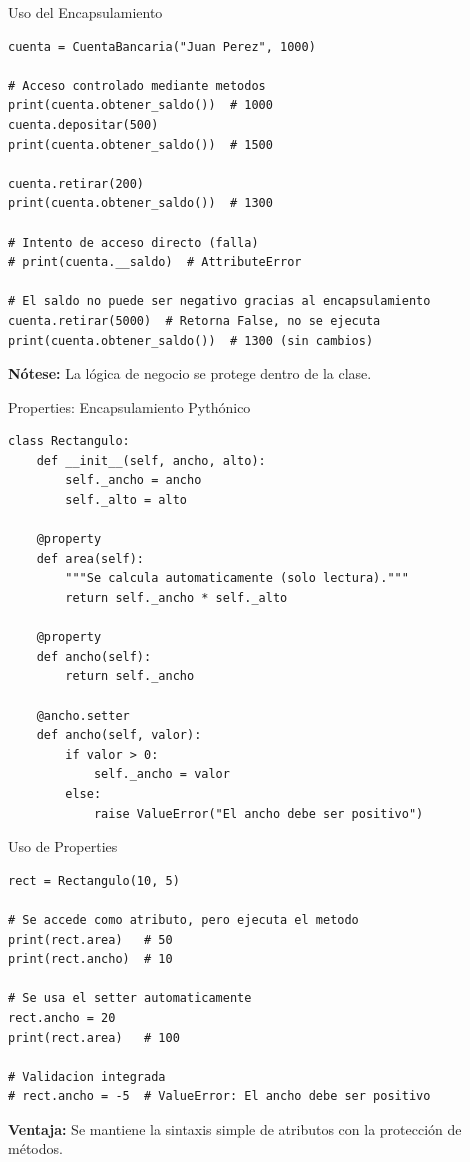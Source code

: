 \documentclass[aspectratio=169]{beamer}
\begin{document}
\begin{frame}[fragile]{Uso del Encapsulamiento}
    \begin{lstlisting}[title=Protección de Datos]
cuenta = CuentaBancaria("Juan Perez", 1000)

# Acceso controlado mediante metodos
print(cuenta.obtener_saldo())  # 1000
cuenta.depositar(500)
print(cuenta.obtener_saldo())  # 1500

cuenta.retirar(200)
print(cuenta.obtener_saldo())  # 1300

# Intento de acceso directo (falla)
# print(cuenta.__saldo)  # AttributeError

# El saldo no puede ser negativo gracias al encapsulamiento
cuenta.retirar(5000)  # Retorna False, no se ejecuta
print(cuenta.obtener_saldo())  # 1300 (sin cambios)
    \end{lstlisting}
    
    \textbf{Nótese:} La lógica de negocio se protege dentro de la clase.
\end{frame}

\begin{frame}[fragile]{Properties: Encapsulamiento Pythónico}
    \begin{lstlisting}[title=Uso de @property]
class Rectangulo:
    def __init__(self, ancho, alto):
        self._ancho = ancho
        self._alto = alto
    
    @property
    def area(self):
        """Se calcula automaticamente (solo lectura)."""
        return self._ancho * self._alto
    
    @property
    def ancho(self):
        return self._ancho
    
    @ancho.setter
    def ancho(self, valor):
        if valor > 0:
            self._ancho = valor
        else:
            raise ValueError("El ancho debe ser positivo")
    \end{lstlisting}
\end{frame}

\begin{frame}[fragile]{Uso de Properties}
    \begin{lstlisting}[title=Acceso Transparente]
rect = Rectangulo(10, 5)

# Se accede como atributo, pero ejecuta el metodo
print(rect.area)   # 50
print(rect.ancho)  # 10

# Se usa el setter automaticamente
rect.ancho = 20
print(rect.area)   # 100

# Validacion integrada
# rect.ancho = -5  # ValueError: El ancho debe ser positivo
    \end{lstlisting}
    
    \vspace{0.3cm}
    \textbf{Ventaja:} Se mantiene la sintaxis simple de atributos con la protección de métodos.
\end{frame}
\end{document}
